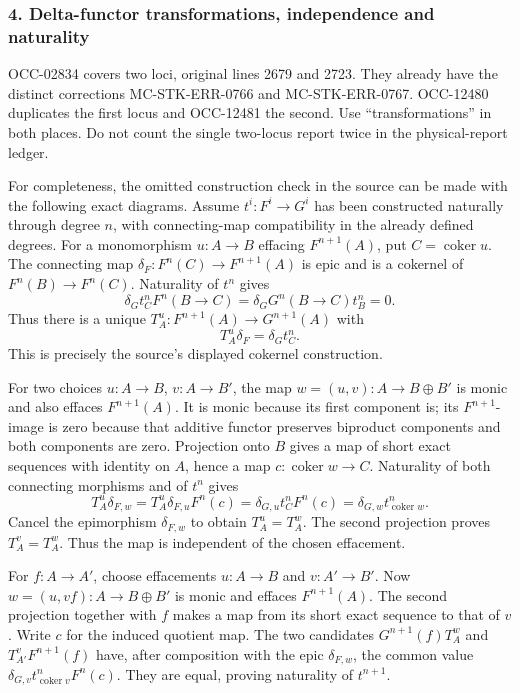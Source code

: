 \documentclass[11pt]{article}
\begin{document}
\subsubsection{4. Delta-functor transformations, independence and naturality}\label{delta-functor-transformations-independence-and-naturality}

OCC-02834 covers two loci, original lines 2679 and 2723. They already have the distinct corrections MC-STK-ERR-0766 and MC-STK-ERR-0767. OCC-12480 duplicates the first locus and OCC-12481 the second. Use ``transformations'' in both places. Do not count the single two-locus report twice in the physical-report ledger.

For completeness, the omitted construction check in the source can be made with the following exact diagrams. Assume \(t^i:F^i\to G^i\) has been constructed naturally through degree \(n\), with connecting-map compatibility in the already defined degrees. For a monomorphism \(u:A\to B\) effacing \(F^{n+1}(A)\), put \(C=\operatorname{coker}u\). The connecting map \(\delta_F:F^n(C)\to F^{n+1}(A)\) is epic and is a cokernel of \(F^n(B)\to F^n(C)\). Naturality of \(t^n\) gives \[
\delta_Gt_C^nF^n(B\to C)
=\delta_GG^n(B\to C)t_B^n=0.
\] Thus there is a unique \(T_A^u:F^{n+1}(A)\to G^{n+1}(A)\) with \[
T_A^u\delta_F=\delta_Gt_C^n.
\] This is precisely the source's displayed cokernel construction.

For two choices \(u:A\to B\), \(v:A\to B'\), the map \(w=(u,v):A\to B\oplus B'\) is monic and also effaces \(F^{n+1}(A)\). It is monic because its first component is; its \(F^{n+1}\)-image is zero because that additive functor preserves biproduct components and both components are zero. Projection onto \(B\) gives a map of short exact sequences with identity on \(A\), hence a map \(c:\operatorname{coker}w\to C\). Naturality of both connecting morphisms and of \(t^n\) gives \[
T_A^u\delta_{F,w}
=T_A^u\delta_{F,u}F^n(c)
=\delta_{G,u}t_C^nF^n(c)
=\delta_{G,w}t_{\operatorname{coker}w}^n.
\] Cancel the epimorphism \(\delta_{F,w}\) to obtain \(T_A^u=T_A^w\). The second projection proves \(T_A^v=T_A^w\). Thus the map is independent of the chosen effacement.

For \(f:A\to A'\), choose effacements \(u:A\to B\) and \(v:A'\to B'\). Now \(w=(u,vf):A\to B\oplus B'\) is monic and effaces \(F^{n+1}(A)\). The second projection together with \(f\) makes a map from its short exact sequence to that of \(v\). Write \(c\) for the induced quotient map. The two candidates \(G^{n+1}(f)T_A^w\) and \(T_{A'}^vF^{n+1}(f)\) have, after composition with the epic \(\delta_{F,w}\), the common value \(\delta_{G,v}t_{\operatorname{coker}v}^nF^n(c)\). They are equal, proving naturality of \(t^{n+1}\).
\end{document}
